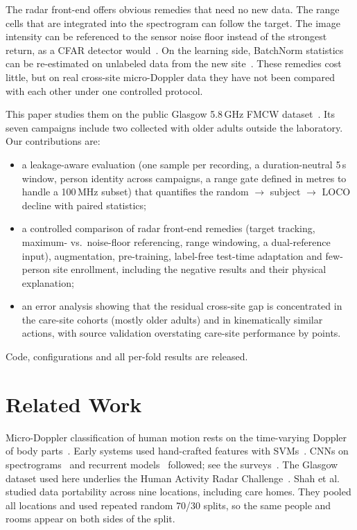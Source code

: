 \documentclass[11pt,a4paper]{article}
\begin{document}
The radar front-end offers obvious remedies that need no new data. The range cells that are integrated into the spectrogram can follow the target. The image intensity can be referenced to the sensor noise floor instead of the strongest return, as a CFAR detector would~\cite{rohling1983cfar}. On the learning side, BatchNorm statistics can be re-estimated on unlabeled data from the new site~\cite{li2018adabn}. These remedies cost little, but on real cross-site micro-Doppler data they have not been compared with each other under one controlled protocol.

This paper studies them on the public Glasgow 5.8\,GHz FMCW dataset~\cite{gla848}. Its seven campaigns include two collected with older adults outside the laboratory. Our contributions are:
\begin{itemize}
\item a leakage-aware evaluation (one sample per recording, a duration-neutral 5\,s window, person identity across campaigns, a range gate defined in metres to handle a 100\,MHz subset) that quantifies the random $\rightarrow$ subject $\rightarrow$ LOCO decline with paired statistics;
\item a controlled comparison of radar front-end remedies (target tracking, maximum- vs.\ noise-floor referencing, range windowing, a dual-reference input), augmentation, pre-training, label-free test-time adaptation and few-person site enrollment, including the negative results and their physical explanation;
\item an error analysis showing that the residual cross-site gap is concentrated in the care-site cohorts (mostly older adults) and in kinematically similar actions, with source validation overstating care-site performance by \VALGAP{} points.
\end{itemize}
Code, configurations and all per-fold results are released.

\section{Related Work}
Micro-Doppler classification of human motion rests on the time-varying Doppler of body parts~\cite{chen2006microdoppler}. Early systems used hand-crafted features with SVMs~\cite{kim2009svm}. CNNs on spectrograms~\cite{kim2016dcnn,seyfioglu2018cae} and recurrent models~\cite{shrestha2020bilstm} followed; see the surveys~\cite{gurbuz2019spm,li2019survey}. The Glasgow dataset used here underlies the Human Activity Radar Challenge~\cite{yang2023challenge}. Shah et al.~\cite{shah2022portability} studied data portability across nine locations, including care homes. They pooled all locations and used repeated random 70/30 splits, so the same people and rooms appear on both sides of the split.
\end{document}
